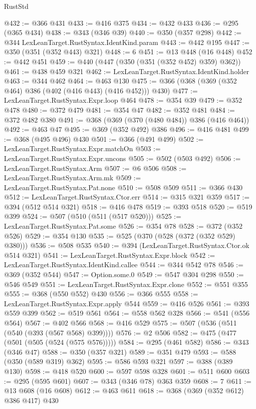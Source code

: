 \begin{lexlean}{RustStd}
\begin{coremodule}
{\begin{coremodule}
{{{{{{{{{{@432 := @366 @431
@433 := @416 @375
@434 := @432 @433
@436 := @295 (@365 @434)
@438 := @343 (@346 @39)
@440 := @350 (@357 @298)
@442 := @344 LexLeanTarget.RustSyntax.IdentKind.param
@443 := @442 @195
@447 := @350 (@351 (@352 @443) @321)
@448 := 6
@451 := @13 @448 (@16 @448)
@452 := @442 @451
@459 := @440 (@447 (@350 (@351 (@352 @452) @359) @362))
@461 := @438 @459 @321
@462 := LexLeanTarget.RustSyntax.IdentKind.holder
@463 := @344 @462
@464 := @463 @130
@475 := @366 (@368 (@369 (@352 @464) @386 (@402 (@416 @443) (@416 @452))) @430)
@477 := LexLeanTarget.RustSyntax.Expr.loop @464
@478 := @354 @39
@479 := @352 @478
@480 := @372 @479
@481 := @354 @47
@482 := @352 @481
@484 := @372 @482 @380
@491 := @368 (@369 (@370 (@480 @484)) @386 (@416 @464))
@492 := @463 @47
@495 := @369 (@352 @492) @386
@496 := @416 @481
@499 := @368 (@495 @496) @430
@501 := @366 (@491 @499)
@502 := LexLeanTarget.RustSyntax.Expr.matchOn
@503 := LexLeanTarget.RustSyntax.Expr.uncons
@505 := @502 (@503 @492)
@506 := LexLeanTarget.RustSyntax.Arm
@507 := @6 @506
@508 := LexLeanTarget.RustSyntax.Arm.mk
@509 := LexLeanTarget.RustSyntax.Pat.none
@510 := @508 @509
@511 := @366 @430
@512 := LexLeanTarget.RustSyntax.Ctor.err
@514 := @315 @321 @359
@517 := @394 (@512 @514 @321)
@518 := @416 @478
@519 := @393 @518
@520 := @519 @399
@524 := @507 (@510 (@511 (@517 @520)))
@525 := LexLeanTarget.RustSyntax.Pat.some
@526 := @354 @78
@528 := @372 (@352 @526)
@529 := @354 @130
@535 := @525 (@370 (@528 (@372 (@352 @529) @380)))
@536 := @508 @535
@540 := @394 (LexLeanTarget.RustSyntax.Ctor.ok @514 @321)
@541 := LexLeanTarget.RustSyntax.Expr.block
@542 := LexLeanTarget.RustSyntax.IdentKind.callee
@544 := @344 @542 @78
@546 := @369 (@352 @544)
@547 := Option.some.{0}
@549 := @547 @304 @298
@550 := @546 @549
@551 := LexLeanTarget.RustSyntax.Expr.clone
@552 := @551 @355
@555 := @368 (@550 @552) @430
@556 := @366 @555
@558 := LexLeanTarget.RustSyntax.Expr.apply @544
@559 := @416 @526
@561 := @393 @559 @399
@562 := @519 @561
@564 := @558 @562 @328
@566 := @541 (@556 @564)
@567 := @402 @566
@568 := @416 @529
@575 := @507 (@536 (@511 (@540 (@393 (@567 @568) @399))))
@576 := @2 @506
@582 := @475 (@477 (@501 (@505 (@524 (@575 @576)))))
@584 := @295 (@461 @582)
@586 := @343 (@346 @47)
@588 := @350 (@357 @321)
@589 := @351 @479
@593 := @588 (@350 (@589 @319) @362)
@595 := @586 @593 @321
@597 := @388 (@389 @130)
@598 := @418 @520
@600 := @597 @598 @328
@601 := @511 @600
@603 := @295 (@595 @601)
@607 := @343 (@346 @78) @363 @359
@608 := 7
@611 := @13 @608 (@16 @608)
@612 := @463 @611
@618 := @368 (@369 (@352 @612) @386 @417) @430
}}}}}}}}}}
\end{coremodule}}
\end{coremodule}
\end{lexlean}
